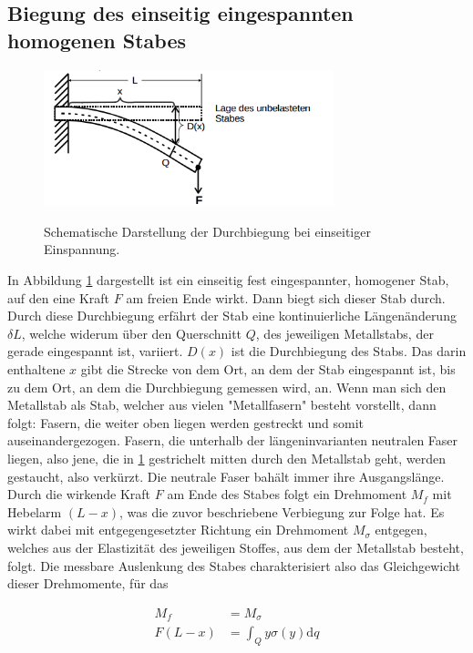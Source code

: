 \documentclass[
  bibliography=totoc,     %
  captions=tableheading,  %
  titlepage=firstiscover, %
]{scrartcl}
\begin{document}
\subsection{Biegung des einseitig eingespannten homogenen Stabes}
\begin{figure}[H]
    \centering
    \caption{Schematische Darstellung der Durchbiegung bei einseitiger Einspannung.}
    \includegraphics[width=0.75\textwidth]{V1031.png}
    \label{fig:1031}
\end{figure}
In Abbildung \ref{fig:1031} dargestellt ist ein einseitig fest eingespannter,
homogener Stab, auf den eine Kraft $F$ am freien Ende wirkt. Dann biegt sich
dieser Stab durch. Durch diese Durchbiegung erfährt der Stab eine
kontinuierliche Längenänderung $\delta{L}$, welche widerum über den Querschnitt
$Q$, des jeweiligen Metallstabs, der gerade eingespannt ist, variiert. $D(x)$
ist die Durchbiegung des Stabs. Das darin enthaltene $x$ gibt die Strecke von
dem Ort, an dem der Stab eingespannt ist, bis zu dem Ort, an dem die
Durchbiegung gemessen wird, an. Wenn man sich den Metallstab als Stab, welcher
aus vielen "Metallfasern" besteht vorstellt, dann folgt: Fasern, die weiter oben
liegen werden gestreckt und somit auseinandergezogen. Fasern, die unterhalb der
längeninvarianten neutralen Faser liegen, also jene, die in \ref{fig:1031}
gestrichelt mitten durch den Metallstab geht, werden gestaucht, also verkürzt.
Die neutrale Faser bahält immer ihre Ausgangslänge. Durch die wirkende
Kraft $F$ am Ende des Stabes folgt ein Drehmoment $M_f$ mit Hebelarm $(L-x)$,
was die zuvor beschriebene Verbiegung zur Folge hat. Es wirkt dabei mit
entgegengesetzter Richtung ein Drehmoment $M_\sigma$ entgegen, welches aus der
Elastizität des jeweiligen Stoffes, aus dem der Metallstab besteht, folgt. Die
messbare Auslenkung des Stabes charakterisiert also das Gleichgewicht dieser
Drehmomente, für das

\begin{align}
	M_f&=M_\sigma\\
	F(L-x)&=\int_Q y\sigma(y)\mathup{d}q
\end{align}
\end{document}
